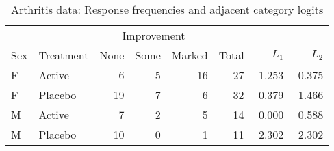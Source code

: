 \begin{table}[htb]
 \caption{Arthritis data: Response frequencies and adjacent category logits}\label{tab:arthlogit2}
 \begin{center}
 \begin{tabular}{ll | rrr | r| rr}
 \hline
      &           & \multicolumn{3}{c|}{Improvement} & \\
  Sex & Treatment & None & Some & Marked & Total & $L_1$ & $L_2$ \\ \hline
% 
  F & Active & 6 & 5 & 16 & 27 & -1.253 & -0.375 \\ 
  F & Placebo & 19 & 7 & 6 & 32 & 0.379 & 1.466 \\[2mm]
%
  M & Active & 7 & 2 & 5 & 14 & 0.000 & 0.588 \\ 
  M & Placebo & 10 & 0 & 1 & 11 & 2.302 & 2.302 \\ 
 \hline
 \end{tabular}
 \end{center}
\end{table}
